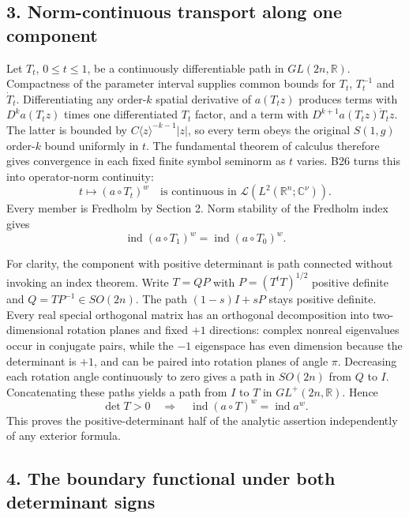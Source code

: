 \documentclass[
  11pt,
]{article}
\begin{document}
\subsection{3. Norm-continuous transport along one
component}\label{norm-continuous-transport-along-one-component}

Let \(T_t\), \(0\le t\le1\), be a continuously differentiable path in
\(GL(2n,\mathbb R)\). Compactness of the parameter interval supplies
common bounds for \(T_t\), \(T_t^{-1}\) and \(\dot T_t\).
Differentiating any order-\(k\) spatial derivative of \(a(T_tz)\)
produces terms with \(D^k a(T_tz)\) times one differentiated \(T_t\)
factor, and a term with \(D^{k+1}a(T_tz)\dot T_tz\). The latter is
bounded by \(C\langle z\rangle^{-k-1}|z|\), so every term obeys the
original \(S(1,g)\) order-\(k\) bound uniformly in \(t\). The
fundamental theorem of calculus therefore gives convergence in each
fixed finite symbol seminorm as \(t\) varies. B26 turns this into
operator-norm continuity: \[
 t\longmapsto(a\circ T_t)^w
       \quad\text{is continuous in }
       \mathcal L(L^2(\mathbb R^n;\mathbb C^\nu)).
 \tag{LS2}
\] Every member is Fredholm by Section 2. Norm stability of the Fredholm
index gives \[
 \operatorname{ind}(a\circ T_1)^w
       =\operatorname{ind}(a\circ T_0)^w .
 \tag{LS3}
\]

For clarity, the component with positive determinant is path connected
without invoking an index theorem. Write \(T=QP\) with
\(P=(T^tT)^{1/2}\) positive definite and \(Q=TP^{-1}\in SO(2n)\). The
path \((1-s)I+sP\) stays positive definite. Every real special
orthogonal matrix has an orthogonal decomposition into two-dimensional
rotation planes and fixed \(+1\) directions: complex nonreal eigenvalues
occur in conjugate pairs, while the \(-1\) eigenspace has even dimension
because the determinant is \(+1\), and can be paired into rotation
planes of angle \(\pi\). Decreasing each rotation angle continuously to
zero gives a path in \(SO(2n)\) from \(Q\) to \(I\). Concatenating these
paths yields a path from \(I\) to \(T\) in \(GL^+(2n,\mathbb R)\). Hence
\[
 \det T>0
 \quad\Longrightarrow\quad
 \operatorname{ind}(a\circ T)^w
       =\operatorname{ind}a^w .
 \tag{LS4}
\] This proves the positive-determinant half of the analytic assertion
independently of any exterior formula.

\subsection{4. The boundary functional under both determinant
signs}\label{the-boundary-functional-under-both-determinant-signs}
\end{document}
